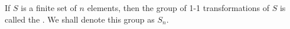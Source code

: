 If $S$ is a finite set of $n$ elements, then the group of 1-1 transformations of $S$ is called the . We shall denote this group as $S_n$.
